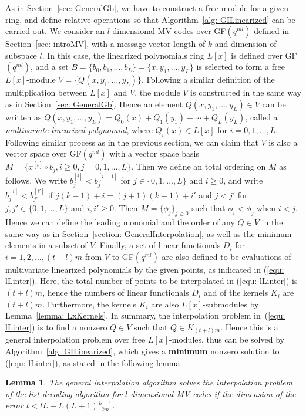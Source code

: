 \documentclass[11pt,onecolumn,draftcls]{IEEEtran}
\newtheorem{lemma}{Lemma}
\begin{document}
As in Section~\ref{sec: GeneralGb}, we have to construct a free module for a given ring, and define relative operations so that Algorithm~\ref{alg: GILinearized} can be carried out. We consider an $l$-dimensional MV codes over GF$(q^{ml})$ defined in Section~\ref{sec: introMV}, with a message vector length of $k$ and dimension of subspace $l$. In this case, the linearized polynomials ring $L[x]$ is defined over GF$(q^{ml})$, and a set $B = \{ b_0, b_1,\ldots, b_L\} = \{ x, y_1,\ldots, y_L\}$ is selected to form a free $L[x]$-module $V = \{Q(x,y_1, \ldots, y_L)\}$. Following a similar definition of the multiplication between $L[x]$ and $V$, the module $V$ is constructed in the same way as in Section~\ref{sec: GeneralGb}. Hence an element $Q(x,y_1, \ldots, y_L) \in V$ can be written as $Q(x,y_1, \ldots, y_L)=Q_0(x)+Q_1(y_1)+\cdots+Q_L(y_L)$, called a \emph{multivariate linearized polynomial}, where $Q_i(x)\in L[x]$ for $i =0,1,\ldots, L$.  Following similar process as in the previous section, we can claim that $V$ is also a vector space over GF$(q^{ml})$ with a vector space basis $M =  \{ x^{[i]} \circ b_{j}, i\ge 0, j = 0, 1,\ldots, L\}$. Then we define an total ordering on $M$ as follows. We write $b_j^{[i]} < b_j^{[i+1]}$ for $j \in \{0,1,\ldots, L\}$ and $i \ge 0$, and write $b_j^{[i]} < b_{j'}^{[i']}$ if $j(k-1) + i = (j+1)(k-1) + i'$ and $j < j'$ for $j,j'\in \{0,1,\ldots, L\}$ and $i,i' \ge 0$. Then $M = \{\phi_j\}_{j \ge 0}$ such that $\phi_i < \phi_j$ when $i < j$. Hence we can define the leading monomial and the order of any $Q \in V$ in the same way as in Section~\ref{section: GeneralInterpolation}, as well as the minimum elements in a subset of $V$. Finally, a set of linear functionals $D_i$ for $i=1,2,\ldots, (t+l)m$ from $V$ to GF$(q^{ml})$ are also defined to be evaluations of multivariate linearized polynomials by the given points, as indicated in (\ref{equ: lLinter}). Here, the total number of points to be interpolated in (\ref{equ: lLinter}) is $(t+l)m$, hence the numbers of linear functionals $D_i$ and of the kernels $K_i$ are $(t+l)m$. Furthermore, the kernels $K_i$ are also $L[x]$-submodules by Lemma~\ref{lemma: LxKernels}. In summary, the interpolation problem in~(\ref{equ: lLinter}) is to find a nonzero $Q\in V$ such that $Q \in \overline{K}_{(t+l)m}$. Hence this is a general interpolation problem over free $L[x]$-modules, thus can be solved by Algorithm~\ref{alg: GILinearized}, which gives a \textbf{minimum} nonzero solution to (\ref{equ: lLinter}), as stated in the following lemma.
\begin{lemma} \label{lemma: 1Lalg1}
The general interpolation algorithm solves the interpolation problem of the list decoding algorithm for $l$-dimensional MV codes if the dimension of the error $t < lL - L(L+1) \frac{k-1}{2m}$.
\end{lemma}
\end{document}
